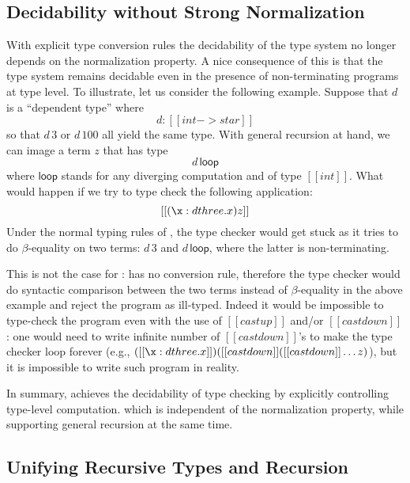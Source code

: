 \subsection{Decidability without Strong Normalization}

With explicit type conversion rules the decidability of the
type system no longer depends on the normalization property. 
A nice consequence of this is that the type system remains decidable
even in the presence of non-terminating programs at type level.
To illustrate, let us consider the following example. Suppose that $d$ is a ``dependent type'' where
\[d : [[int -> star]]\] so that $d\,3$ or $d\,100$ all yield the same
type. With general recursion at hand, we can image a term $z$ that has
type \[d\,\mathsf{loop}\] where $\mathsf{loop}$ stands for any
diverging computation and of type $[[int]]$. What would happen if we
try to type check the following application: \[ [[(\x: d three.x)z]]\]
Under the normal typing rules of \coc, the type checker would get
stuck as it tries to do $\beta$-equality on two terms: $d\,3$ and
$d\,\mathsf{loop}$, where the latter is non-terminating.

This is not the case for \name: \name has no conversion rule,
therefore the type checker would do syntactic comparison between the
two terms instead of $\beta$-equality in the above example and reject
the program as ill-typed. Indeed it would be impossible to type-check
the program even with the use of $[[castup]]$ and/or $[[castdown]]$:
one would need to write infinite number of $[[castdown]]$'s to make
the type checker loop forever (e.g., $([[\x:d
three.x]])([[castdown]]([[castdown]] \dots z) $), but it is impossible
to write such program in reality.

In summary, \name achieves the decidability of type checking by
explicitly controlling type-level computation.  which is independent of
the normalization property, while supporting general recursion at the
same time.



\subsection{Unifying Recursive Types and Recursion}


